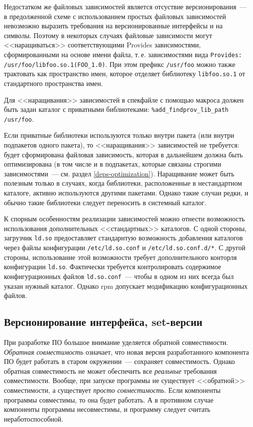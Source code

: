 \documentclass[russian,a4paper,12pt,titlepage]{article}
\begin{document}
Недостатком же файловых зависимостей является отсуствие версионирования~--- в предолженной схеме
с использованием простых файловых зависимостей невозможно выразить требования на версионированные
интерфейсы и на символы.  Поэтому в некоторых случаях файловые зависимости могут <<наращиваться>>
соответствующими Provides зависимостями, сформированными на основе имени файла, т.\,е. зависимостями
вида \texttt{Provides: /usr/foo/libfoo.so.1(FOO\_1.0)}.  При этом префикс \verb|/usr/foo| можно также
трактовать как пространство имен, которое отделяет библиотеку \verb|libfoo.so.1| от стандартного
пространства имен.

Для <<наращивания>> зависимостей в спекфайле с помощью макроса должен быть задан каталог
с приватными библиотеками: \verb|%add_findprov_lib_path /usr/foo|.

Если приватные библиотеки используются только внутри пакета (или внутри подпакетов одного пакета),
то <<наращивания>> зависимостей не требуется: будет сформирована файловая зависимость, которая в дальнейшем должна
быть оптимизирована (в том числе и в подпакетах, которые связаны строгими зависимостями~--- см. раздел \ref{deps-optimization}).
Наращивание может быть полезным только в случаях, когда библиотеки, расположенные в нестандартном каталоге, активно используются
другими пакетами.  Однако такие случаи редки, и обычно такие библиотеки следует переносить в системный каталог.

К спорным особенностям реализации зависимостей можно отнести возможность использования дополнительных <<стандартных>> каталогов.
С одной стороны, загрузчик \verb|ld.so| предоставляет стандарнтую возможность добавления каталогов
через файлы конфигурации \verb|/etc/ld.so.conf| и \verb|/etc/ld.so.conf.d/*|.  С другой стороны, использование этой возможности
требует дополнительного конторля конфигурации \verb|ld.so|.  Фактически требуется контролировать содержимое конфигурационных
файлов \verb|ld.so.conf|~--- чтобы в одном из них всегда был указан нужный каталог.  Однако rpm допускает модификацию
конфигурационных файлов.

\subsection{Версионирование интерфейса, set-версии}
\label{set-versions}
При разработке ПО большое внимание уделяется обратной совместимости.  \emph{Обратная совместимость}
означает, что новая версия разработанного компонента ПО будет работать в старом окружении~--- сохраняет совместимость.
Однако обратная совместимость не может обеспечить все \emph{реальные} требования совместимости.  Вообще,
при запуске программы не существует <<обратной>> совместимости, а существует \emph{просто совместимость}.
Если компоненты программы совместимы, то она будет работать.  А в противном случае компоненты программы несовместимы,
и программу следует считать неработоспособной.
\end{document}
